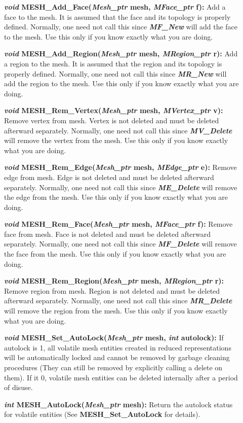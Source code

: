 \documentclass[12pt]{article}
\begin{document}
\begin{description}
\item[]{\bf {\em void} MESH\_Add\_Face({\em Mesh\_ptr} mesh,
    {\em MFace\_ptr} f):} Add a face to the mesh. It is assumed
  that the face and its topology is properly defined. Normally, one
  need not call this since {\bf {\em MF\_New}} will add the face
  to the mesh. Use this only if you know exactly what you are doing.

\item[]{\bf {\em void} MESH\_Add\_Region({\em Mesh\_ptr}
    mesh, {\em MRegion\_ptr} r):} Add a region to the mesh. It is
  assumed that the region and its topology is properly defined.
  Normally, one need not call this since {\bf {\em MR\_New}}
  will add the region to the mesh. Use this only if you know exactly
  what you are doing.

\item[]{\bf {\em void} MESH\_Rem\_Vertex({\em Mesh\_ptr}
    mesh, {\em MVertex\_ptr} v):} Remove vertex from mesh. Vertex
  is not deleted and must be deleted afterward separately. Normally,
  one need not call this since {\bf {\em MV\_Delete}} will
  remove the vertex from the mesh. Use this only if you know exactly
  what you are doing.

\item[]{\bf {\em void} MESH\_Rem\_Edge({\em Mesh\_ptr} mesh,
    {\em MEdge\_ptr} e):} Remove edge from mesh. Edge is not
  deleted and must be deleted afterward separately. Normally, one need
  not call this since {\bf {\em ME\_Delete}} will remove the
  edge from the mesh. Use this only if you know exactly what you are
  doing.
  
\item[]{\bf {\em void} MESH\_Rem\_Face({\em Mesh\_ptr} mesh,
    {\em MFace\_ptr} f):} Remove face from mesh. Face is not
  deleted and must be deleted afterward separately. Normally, one need
  not call this since {\bf {\em MF\_Delete}} will remove the
  face from the mesh. Use this only if you know exactly what you are
  doing.
  
\item[]{\bf {\em void} MESH\_Rem\_Region({\em Mesh\_ptr}
    mesh, {\em MRegion\_ptr} r):} Remove region from mesh. Region
  is not deleted and must be deleted afterward separately. Normally,
  one need not call this since {\bf {\em MR\_Delete}} will
  remove the region from the mesh. Use this only if you know exactly
  what you are doing.


\item[]{\bf {\em void} MESH\_Set\_AutoLock({\em Mesh\_ptr} mesh, {\em
      int} autolock):} If autolock is 1, all volatile mesh entities
  created in reduced representations will be automatically locked and
  cannot be removed by garbage cleaning procedures (They can still be
  removed by explicitly calling a delete on them). If it 0, volatile
  mesh entities can be deleted internally after a period of disuse.

\item[]{\bf {\em int} MESH\_AutoLock({\em Mesh\_ptr} mesh):} Return
the autolock status for volatile entities (See {\bf
  MESH\_Set\_AutoLock} for details).

\end{description}
\end{document}
